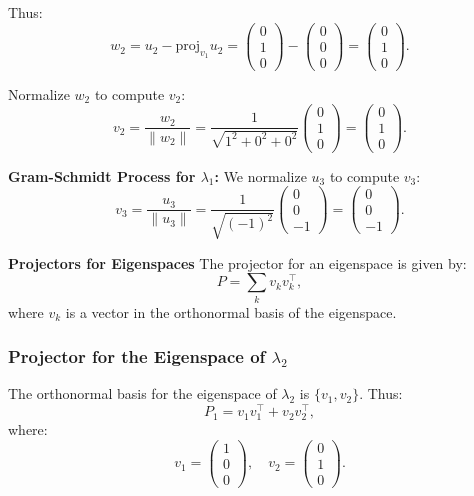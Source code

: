 \documentclass{article}
\theoremstyle{plain}
\numberwithin{thm}{section}
\theoremstyle{definition}
\begin{document}
\begin{enumerate}
    Thus:
    \[
    w_2 = u_2 - \text{proj}_{v_1} u_2 = \begin{pmatrix} 0 \\ 1 \\ 0 \end{pmatrix} - \begin{pmatrix} 0 \\ 0 \\ 0 \end{pmatrix} = \begin{pmatrix} 0 \\ 1 \\ 0 \end{pmatrix}.
    \]
    
    Normalize $w_2$ to compute $v_2$:
    \[
    v_2 = \frac{w_2}{\|w_2\|} = \frac{1}{\sqrt{1^2 + 0^2 + 0^2}} \begin{pmatrix} 0 \\ 1 \\ 0 \end{pmatrix} = \begin{pmatrix} 0 \\ 1 \\ 0 \end{pmatrix}.
    \]
    
   \textbf{Gram-Schmidt Process for $\lambda_1$:} We normalize $u_3$ to compute $v_3$:
    \[
    v_3 = \frac{u_3}{\|u_3\|} = \frac{1}{\sqrt{(-1)^2}} \begin{pmatrix} 0 \\ 0 \\ -1 \end{pmatrix} = \begin{pmatrix} 0 \\ 0 \\ -1 \end{pmatrix}.
    \]
    
    \textbf{Projectors for Eigenspaces}
    The projector for an eigenspace is given by:
    \[
    P = \sum_k v_k v_k^\top,
    \]
    where $v_k$ is a vector in the orthonormal basis of the eigenspace.
    
    \subsubsection*{Projector for the Eigenspace of $\lambda_2$}
    
    The orthonormal basis for the eigenspace of $\lambda_2$ is $\{v_1, v_2\}$. Thus:
    \[
    P_1 = v_1 v_1^\top + v_2 v_2^\top,
    \]
    where:
    \[
    v_1 = \begin{pmatrix} 1 \\ 0 \\ 0 \end{pmatrix}, \quad v_2 = \begin{pmatrix} 0 \\ 1 \\ 0 \end{pmatrix}.
    \]
    

\end{enumerate}
\end{document}
